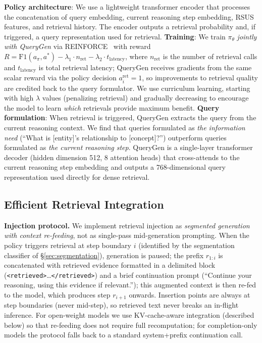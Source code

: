 \documentclass[sigconf,natbib=true]{acmart}
\begin{document}
\textbf{Policy architecture}: We use a lightweight transformer encoder that processes the concatenation of query embedding, current reasoning step embedding, RSUS features, and retrieval history. The encoder outputs a retrieval probability and, if triggered, a query representation used for retrieval. \textbf{Training}: We train $\pi_\theta$ \emph{jointly with QueryGen} via REINFORCE~\cite{williams1992reinforce} with reward $R = \text{F1}(a_\pi, a^*) - \lambda_1 \cdot n_{\text{ret}} - \lambda_2 \cdot t_{\text{latency}}$, where $n_{\text{ret}}$ is the number of retrieval calls and $t_{\text{latency}}$ is total retrieval latency; QueryGen receives gradients from the same scalar reward via the policy decision $a_i^{\text{ret}}=1$, so improvements to retrieval quality are credited back to the query formulator. We use curriculum learning, starting with high $\lambda$ values (penalizing retrieval) and gradually decreasing to encourage the model to learn \emph{which} retrievals provide maximum benefit. \textbf{Query formulation}: When retrieval is triggered, QueryGen extracts the query from the current reasoning context. We find that queries formulated as \emph{the information need} (``What is [entity]'s relationship to [concept]?'') outperform queries formulated as \emph{the current reasoning step}. QueryGen is a single-layer transformer decoder (hidden dimension 512, 8 attention heads) that cross-attends to the current reasoning step embedding and outputs a 768-dimensional query representation used directly for dense retrieval.

\subsection{Efficient Retrieval Integration}
\label{sec:integration}

\textbf{Injection protocol.}
We implement retrieval injection as \emph{segmented generation with context re-feeding}, not as single-pass mid-generation prompting. When the policy triggers retrieval at step boundary $i$ (identified by the segmentation classifier of \S\ref{sec:segmentation}), generation is paused; the prefix $r_{1:i}$ is concatenated with retrieved evidence formatted in a delimited block (\texttt{<retrieved>}\ldots\texttt{</retrieved>}) and a brief continuation prompt (``Continue your reasoning, using this evidence if relevant.''); this augmented context is then re-fed to the model, which produces step $r_{i+1}$ onwards. Insertion points are always at step boundaries (never mid-step), so retrieved text never breaks an in-flight inference. For open-weight models we use KV-cache-aware integration (described below) so that re-feeding does not require full recomputation; for completion-only models the protocol falls back to a standard system+prefix continuation call.
\end{document}
